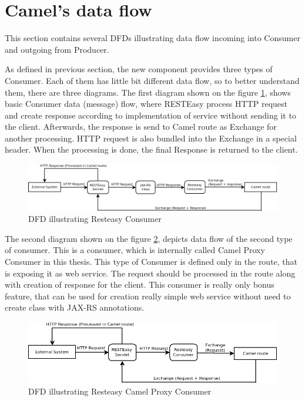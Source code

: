 \documentclass[12pt,final,oneside]{fithesis2}
\begin{document}
\section{Camel's data flow}
This section contains several DFDs illustrating data flow incoming into Consumer and outgoing from Producer. 

As defined in previous section, the new component provides three types of Consumer. Each of them has little bit different data flow, so to better understand them, there are three diagrams. The first diagram shown on the figure \ref{dfd-basic}, shows basic Consumer data (message) flow, where RESTEasy process HTTP request and create response according to implementation of service without sending it to the client. Afterwards, the response is send to Camel route as Exchange for another processing. HTTP request is also bundled into the Exchange in a special header. When the processing  is done, the final Response is returned to the client. 

\begin{figure}[h]
\advance\leftskip-2cm
\includegraphics[width=1.3\linewidth]{diagrams/basic.png}
\caption{DFD illustrating Resteasy Consumer}
\label{dfd-basic}
\end{figure}

The second diagram shown on the figure \ref{dfd-camel}, depicts data flow of the second type of consumer. This is a consumer, which is internally called Camel Proxy Consumer in this thesis. This type of Consumer is defined only in the route, that is exposing it as web service. The request should be processed in the route along with creation of response for the client. This consumer is really only bonus feature, that can be used for creation really simple web service without need to create class with JAX-RS annotations. 

\begin{figure}[h]
\advance\leftskip-0.5cm
\includegraphics[width=1.1\linewidth]{diagrams/camelProxy.png}
\caption{DFD illustrating Resteasy Camel Proxy Consumer}
\label{dfd-camel}
\end{figure}
\end{document}
